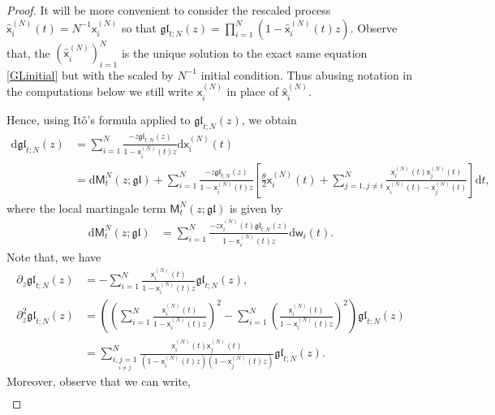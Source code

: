 \documentclass[]{article}
\begin{document}
\begin{proof} It will be more convenient to consider the rescaled process $\hat{\mathsf{x}}^{(N)}_i(t)=N^{-1}\mathsf{x}_i^{(N)}$ so that $\mathfrak{gl}_{t;N}(z)=\prod_{i=1}^N(1-\hat{\mathsf{x}}_i^{(N)}(t)z)$. Observe that, the $(\hat{\mathsf{x}}_i^{(N)})_{i=1}^N$ is the unique solution to the exact same equation \eqref{GLinitial} but with the scaled by $N^{-1}$ initial condition. Thus abusing notation in the computations below we still write $\mathsf{x}_i^{(N)}$ in place of $\hat{\mathsf{x}}_i^{(N)}$.

Hence, using It\^{o}'s formula applied to $\mathfrak{gl}_{t;N}(z)$, we obtain 
\begin{align*}
    \mathrm{d}\mathfrak{gl}_{t;N}(z)
    &=
    \sum_{i=1}^N\frac{-z\mathfrak{gl}_{t;N}(z)}{1-\mathsf{x}_i^{(N)}(t)z}\mathrm{d}\mathsf{x}_i^{(N)}(t)
    \\
    &=
	\mathrm{d}\mathsf{M}_t^N(z;\mathfrak{gl})
+
\sum_{i=1}^N\frac{-z\mathfrak{gl}_{t;N}(z)}{1-\mathsf{x}_i^{(N)}(t)z}
\left[
     \frac{\theta}{2}\mathsf{x}_i^{(N)}(t)
     +\sum_{j=1,j\neq i}^N\frac{\mathsf{x}_i^{(N)}(t)\mathsf{x}^{(N)}_j(t)}{\mathsf{x}^{(N)}_i(t)-\mathsf{x}^{(N)}_j(t)}
     \right]\mathrm{d}t,
\end{align*}
where the local martingale term $\mathsf{M}_t^N(z;\mathfrak{gl})$ is given by
\begin{align}\label{M_t^N}
\mathrm{d}\mathsf{M}_t^N(z;\mathfrak{gl})&=\sum_{i=1}^N\frac{-z\mathsf{x}_i^{(N)}(t)\mathfrak{gl}_{t;N}(z)}{1-\mathsf{x}_i^{(N)}(t)z}\mathrm{d}\mathsf{w}_i(t).
\end{align}
Note that, we have
\begin{align}
    \partial_z\mathfrak{gl}_{t;N}(z)
    &=
    -\sum_{i=1}^N\frac{\mathsf{x}_i^{(N)}(t)}{1-\mathsf{x}_i^{(N)}(t)z}\mathfrak{gl}_{t;N}(z),
    \label{partial_z phi}
    \\
    \partial_{z}^2\mathfrak{gl}_{t;N}(z)
    &=
    \left(\left(\sum_{i=1}^N\frac{\mathsf{x}_i^{(N)}(t)}{1-\mathsf{x}_i^{(N)}(t)z}
    \right)^2-\sum_{i=1}^N \left(\frac{\mathsf{x}_i^{(N)}(t)}{1-\mathsf{x}_i^{(N)}(t)z}\right)^2
    \right)
    \mathfrak{gl}_{t;N}(z)\\
    &=
\sum_{\underset{i\neq j}{i,j=1}}^N\frac{\mathsf{x}_i^{(N)}(t)\mathsf{x}_j^{(N)}(t)}{\left(1-\mathsf{x}_i^{(N)}(t)z\right)\left(1-\mathsf{x}_j^{(N)}(t)z\right)}
    \mathfrak{gl}_{t;N}(z).
    \label{partial_zz phi}
\end{align}
Moreover, observe that we can write,
\begin{align*}

\end{align*}
\end{proof}
\end{document}
